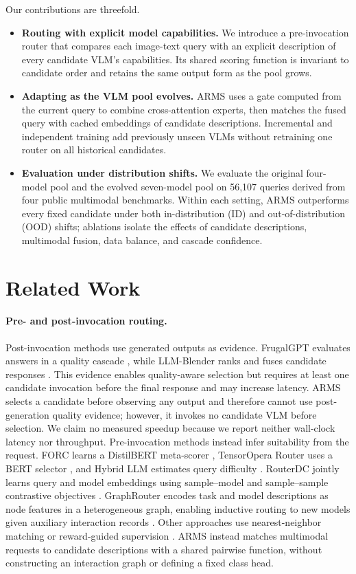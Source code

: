 \documentclass[letterpaper]{article}
\begin{document}
Our contributions are threefold.
\begin{itemize}
  \item \textbf{Routing with explicit model capabilities.} We introduce a
  pre-invocation router that compares each image-text query with an explicit
  description of every candidate VLM's capabilities. Its shared scoring
  function is invariant to candidate order and retains the same output form as
  the pool grows.
  \item \textbf{Adapting as the VLM pool evolves.} ARMS uses a gate computed
  from the current query to combine cross-attention experts, then matches the
  fused query with cached embeddings of candidate descriptions. Incremental and
  independent training add previously unseen VLMs without retraining one router
  on all historical candidates.
  \item \textbf{Evaluation under distribution shifts.} We evaluate the original
  four-model pool and the evolved seven-model pool on 56,107 queries derived
  from four public multimodal benchmarks. Within each setting, ARMS outperforms
  every fixed candidate under both in-distribution (ID) and
  out-of-distribution (OOD) shifts; ablations isolate the effects of candidate
  descriptions, multimodal fusion, data balance, and cascade confidence.
\end{itemize}


\section{Related Work}

\paragraph{Pre- and post-invocation routing.}
Post-invocation methods use generated outputs as evidence. FrugalGPT evaluates
answers in a quality cascade \citep{FrugalGPT}, while LLM-Blender ranks and fuses
candidate responses \citep{LLM-Blender}. This evidence enables quality-aware
selection but requires at least one candidate invocation before the final
response and may increase latency. ARMS selects a candidate before observing any
output and therefore cannot use post-generation quality evidence; however, it
invokes no candidate VLM before selection. We claim no measured speedup because
we report neither wall-clock latency nor throughput.
Pre-invocation methods instead infer suitability from the request. FORC learns a
DistilBERT meta-scorer \citep{FORC}, TensorOpera Router uses a BERT selector
\citep{TO-Router}, and Hybrid LLM estimates query difficulty
\citep{Hybrid-LLM}. RouterDC jointly learns query and model embeddings using
sample--model and sample--sample contrastive objectives \citep{RouterDC}.
GraphRouter encodes task and model descriptions as node features in a
heterogeneous graph, enabling inductive routing to new models given auxiliary
interaction records \citep{GraphRouter}. Other approaches use nearest-neighbor
matching \citep{Routing} or reward-guided supervision \citep{ZOOTER}. ARMS
instead matches multimodal requests to candidate descriptions with a shared
pairwise function, without constructing an interaction graph or defining a
fixed class head.
\end{document}
